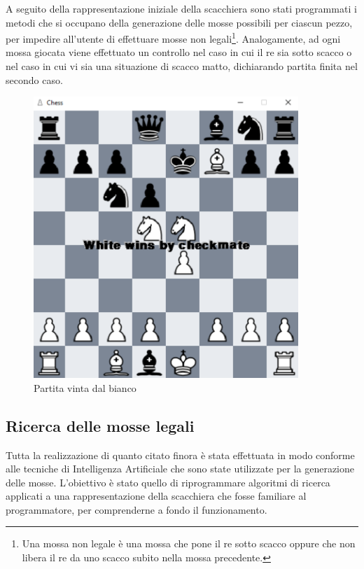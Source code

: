 A seguito della rappresentazione iniziale della scacchiera sono stati programmati i metodi che si occupano della generazione delle mosse possibili per ciascun pezzo, per impedire all'utente di effettuare mosse non legali\footnote{Una mossa non legale è una mossa che pone il re sotto scacco oppure che non libera il re da uno scacco subito nella mossa precedente.}. Analogamente, ad ogni mossa giocata viene effettuato un controllo nel caso in cui il re sia sotto scacco o nel caso in cui vi sia una situazione di scacco matto, dichiarando partita finita nel secondo caso. \newpage
\begin{figure}[!htb]
    \includegraphics[width=10cm]{frontmatter/figure/checkmate.pdf}
    \centering
    \caption{Partita vinta dal bianco}
    \label{fig:checkmate}
\end{figure}


\subsection{Ricerca delle mosse legali}
Tutta la realizzazione di quanto citato finora è stata effettuata in modo conforme alle tecniche di Intelligenza Artificiale che sono state utilizzate per la generazione delle mosse. L'obiettivo è stato quello di riprogrammare algoritmi di ricerca applicati a una rappresentazione della scacchiera che fosse familiare al programmatore, per comprenderne a fondo il funzionamento. 

